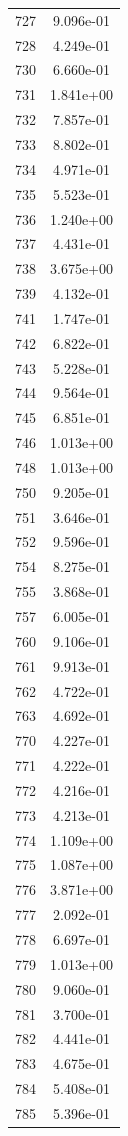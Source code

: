 \documentclass[12pt]{article}
\begin{document}
\begin{longtable}{@{}cc@{}}
727 & 9.096e-01 \\
728 & 4.249e-01 \\
730 & 6.660e-01 \\
731 & 1.841e+00 \\
732 & 7.857e-01 \\
733 & 8.802e-01 \\
734 & 4.971e-01 \\
735 & 5.523e-01 \\
736 & 1.240e+00 \\
737 & 4.431e-01 \\
738 & 3.675e+00 \\
739 & 4.132e-01 \\
741 & 1.747e-01 \\
742 & 6.822e-01 \\
743 & 5.228e-01 \\
744 & 9.564e-01 \\
745 & 6.851e-01 \\
746 & 1.013e+00 \\
748 & 1.013e+00 \\
750 & 9.205e-01 \\
751 & 3.646e-01 \\
752 & 9.596e-01 \\
754 & 8.275e-01 \\
755 & 3.868e-01 \\
757 & 6.005e-01 \\
760 & 9.106e-01 \\
761 & 9.913e-01 \\
762 & 4.722e-01 \\
763 & 4.692e-01 \\
770 & 4.227e-01 \\
771 & 4.222e-01 \\
772 & 4.216e-01 \\
773 & 4.213e-01 \\
774 & 1.109e+00 \\
775 & 1.087e+00 \\
776 & 3.871e+00 \\
777 & 2.092e-01 \\
778 & 6.697e-01 \\
779 & 1.013e+00 \\
780 & 9.060e-01 \\
781 & 3.700e-01 \\
782 & 4.441e-01 \\
783 & 4.675e-01 \\
784 & 5.408e-01 \\
785 & 5.396e-01 \\

\end{longtable}
\end{document}
